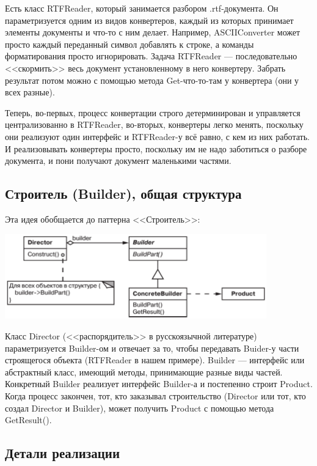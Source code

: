 \documentclass{../../text-style}
\begin{document}
Есть класс RTFReader, который занимается разбором .rtf-документа. Он параметризуется одним из видов конвертеров, каждый из которых принимает элементы документы и что-то с ним делает. Например, ASCIIConverter может просто каждый переданный символ добавлять к строке, а команды форматирования просто игнорировать. Задача RTFReader --- последовательно <<скормить>> весь документ установленному в него конвертеру. Забрать результат потом можно с помощью метода Get-что-то-там у конвертера (они у всех разные).

Теперь, во-первых, процесс конвертации строго детерминирован и управляется централизованно в RTFReader, во-вторых, конвертеры легко менять, поскольку они реализуют один интерфейс и RTFReader-у всё равно, с кем из них работать. И реализовывать конвертеры просто, поскольку им не надо заботиться о разборе документа, и пони получают документ маленькими частями.

\subsection{Строитель (Builder), общая структура}

Эта идея обобщается до паттерна <<Строитель>>:

\begin{center}
    \includegraphics[width=0.85\textwidth]{builder.png}
\end{center}

Класс Director (<<распорядитель>> в русскоязычной литературе) параметризуется Builder-ом и отвечает за то, чтобы передавать Buider-у части строящегося объекта (RTFReader в нашем примере). Builder --- интерфейс или абстрактный класс, имеющий методы, принимающие разные виды частей. Конкретный Builder реализует интерфейс Builder-а и постепенно строит Product. Когда процесс закончен, тот, кто заказывал строительство (Director или тот, кто создал Director и Builder), может получить Product с помощью метода GetResult().

\subsection{Детали реализации}
\end{document}
